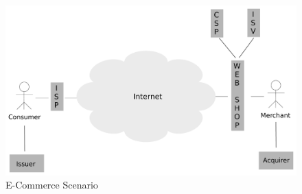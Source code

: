 \begin{figure}[H]
	\centering
		\includegraphics[width=0.8\columnwidth]{images/e-commerce-scenario.pdf}
	\caption{E-Commerce Scenario}
\label{fig:images_ecommerce_scenario}
\end{figure}



